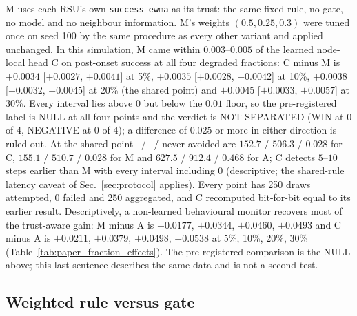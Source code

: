 M uses each RSU's own \texttt{success\_ewma} as its trust: the same fixed rule, no gate, no model and no neighbour information.
M's weights $(0.5,0.25,0.3)$ were tuned once on seed 100 by the same procedure as every other variant and applied unchanged.
In this simulation, M came within $0.003$--$0.005$ of the learned node-local head C on post-onset success at all four degraded fractions: C minus M is $+0.0034$ [$+0.0027$, $+0.0041$] at 5\%, $+0.0035$ [$+0.0028$, $+0.0042$] at 10\%, $+0.0038$ [$+0.0032$, $+0.0045$] at 20\% (the shared point) and $+0.0045$ [$+0.0033$, $+0.0057$] at 30\%.
Every interval lies above $0$ but below the $0.01$ floor, so the pre-registered label is NULL at all four points and the verdict is NOT SEPARATED (WIN at 0 of 4, NEGATIVE at 0 of 4); a difference of $0.025$ or more in either direction is ruled out.
At the shared point \nav\ / \nwin\ / never-avoided are $152.7$ / $506.3$ / $0.028$ for C, $155.1$ / $510.7$ / $0.028$ for M and $627.5$ / $912.4$ / $0.468$ for A; C detects $5$--$10$ steps earlier than M with every interval including $0$ (descriptive; the shared-rule latency caveat of Sec.~\ref{sec:protocol} applies).
Every point has 250 draws attempted, 0 failed and 250 aggregated, and C recomputed bit-for-bit equal to its earlier result.
Descriptively, a non-learned behavioural monitor recovers most of the trust-aware gain: M minus A is $+0.0177$, $+0.0344$, $+0.0460$, $+0.0493$ and C minus A is $+0.0211$, $+0.0379$, $+0.0498$, $+0.0538$ at 5\%, 10\%, 20\%, 30\% (Table~\ref{tab:paper_fraction_effects}).
The pre-registered comparison is the NULL above; this last sentence describes the same data and is not a second test.

\subsection{Weighted rule versus gate}
\label{sec:gate}

